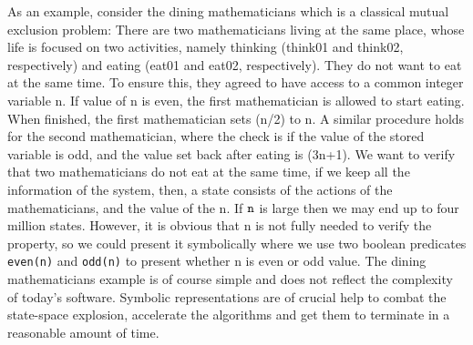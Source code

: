 As an example, consider the dining mathematicians which is a  classical mutual exclusion problem: There are two mathematicians living at the same place, whose life is focused on two activities, namely thinking (think01 and think02, respectively) and eating (eat01 and eat02, respectively). They do not want to eat at the same time. To ensure this, they agreed to have access to a common integer variable n.  If value of n is even, the first mathematician is allowed to start eating. When finished, the first mathematician sets (n/2) to n. A similar procedure holds for the second mathematician, where the check is if the value of the stored variable is odd, and the value set back after eating is (3n+1). 
We want to verify that 
two mathematicians do not eat at the same time, 
if we keep all the information of the system, then, a state consists of the  actions of the mathematicians, and the value of the n. If $\tt n$ is large then we may end up to four million states.  However, it is obvious that n is not fully needed to verify the property, so we could present it symbolically where we use two boolean predicates {\tt even(n)} and {\tt odd(n)} to present  whether n is even or odd  value. The dining mathematicians example is of course simple and does not reflect the complexity of today’s software. Symbolic representations are of crucial help to combat the state-space explosion, accelerate the algorithms and get them to terminate in a reasonable amount of time. 


